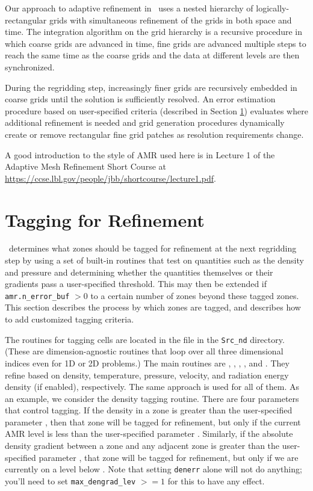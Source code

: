 Our approach to adaptive refinement in \castro\ uses a nested hierarchy
of logically-rectangular grids with simultaneous refinement of the
grids in both space and time.  The integration algorithm on the grid
hierarchy is a recursive procedure in which coarse grids are advanced
in time, fine grids are advanced multiple steps to reach the same time
as the coarse grids and the data at different levels are then
synchronized.

During the regridding step, increasingly finer grids
are recursively embedded in coarse grids until the solution is
sufficiently resolved.  An error estimation procedure based on
user-specified criteria (described in Section \ref{sec:tagging}) 
evaluates where additional refinement is needed
and grid generation procedures dynamically create or
remove rectangular fine grid patches as resolution requirements change.

A good introduction to the style of AMR used here is in Lecture 1
of the Adaptive Mesh Refinement Short Course at
\url{https://ccse.lbl.gov/people/jbb/shortcourse/lecture1.pdf}.

\section{Tagging for Refinement}
\label{sec:tagging}

\castro\ determines what zones should be tagged for refinement at the
next regridding step by using a set of built-in routines that test on
quantities such as the density and pressure and determining whether
the quantities themselves or their gradients pass a user-specified
threshold.  This may then be extended if {\tt amr.n\_error\_buf} $> 0$
to a certain number of zones beyond these tagged zones. This section
describes the process by which zones are tagged, and describes how to
add customized tagging criteria.

The routines for tagging cells are located in the
 file in the {\tt Src\_nd} directory. (These are
dimension-agnostic routines that loop over all three dimensional
indices even for 1D or 2D problems.) The main routines are
, , ,
, and . They refine based on
density, temperature, pressure, velocity, and radiation energy density
(if enabled), respectively. The same approach is used for all of
them. As an example, we consider the density tagging routine. There
are four parameters that control tagging. If the density in a zone is
greater than the user-specified parameter , then that
zone will be tagged for refinement, but only if the current AMR level
is less than the user-specified parameter .
Similarly, if the absolute density gradient between a zone and any
adjacent zone is greater than the user-specified parameter
, that zone will be tagged for refinement, but only
if we are currently on a level below
. Note that setting {\tt denerr} alone
will not do anything; you'll need to set {\tt max\_dengrad\_lev} $>=
1$ for this to have any effect.

